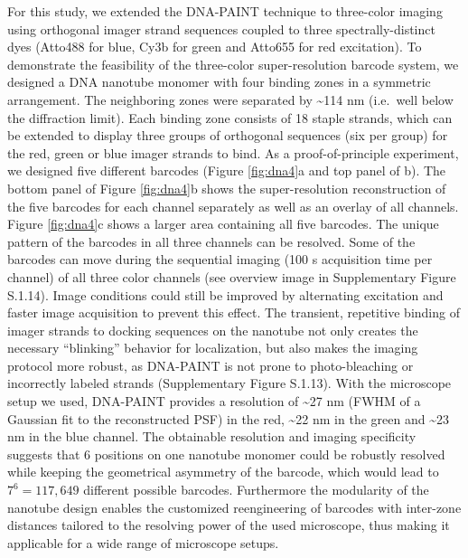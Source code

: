 For this study, we extended the DNA-PAINT technique to three-color imaging 
using orthogonal imager strand sequences coupled to three spectrally-distinct dyes 
(Atto488 for blue, Cy3b for green and Atto655 for red excitation). To demonstrate the 
feasibility of the three-color super-resolution barcode system, we designed a DNA 
nanotube monomer with four binding zones in a symmetric arrangement. The neighboring 
zones were separated by \textasciitilde114 nm (i.e.~well below the diffraction limit). Each binding 
zone consists of 18 staple strands, which can be extended to display three groups of 
orthogonal sequences (six per group) for the red, green or blue imager strands to bind. As 
a proof-of-principle experiment, we designed five different barcodes (Figure \ref{fig:dna4}a and top 
panel of b). The bottom panel of Figure \ref{fig:dna4}b shows the super-resolution reconstruction of 
the five barcodes for each channel separately as well as an overlay of all channels. Figure 
 \ref{fig:dna4}c shows a larger area containing all five barcodes. The unique pattern of the barcodes in 
all three channels can be resolved. Some of the barcodes can move during the sequential 
imaging (100 s acquisition time per channel) of all three color channels (see overview 
image in  Supplementary Figure 
S.1.14). Image conditions could still be improved by alternating excitation 
and faster image acquisition to prevent this effect. The transient, repetitive binding of 
imager strands to docking sequences on the nanotube not only creates the necessary 
``blinking'' behavior for localization, but also makes the imaging protocol more robust, as 
DNA-PAINT is not prone to photo-bleaching or incorrectly labeled strands (Supplementary Figure 
S.1.13). 
With the microscope setup we used, DNA-PAINT provides a resolution of \textasciitilde27 nm 
(FWHM of a Gaussian fit to the reconstructed PSF) in the red, \textasciitilde22 nm in the green and 
\textasciitilde23 nm in the blue channel. The obtainable resolution and imaging specificity suggests 
that 6 positions on one nanotube monomer could be robustly resolved while keeping the 
geometrical asymmetry of the barcode, which would lead to $7^6=117,649$ different 
possible barcodes. Furthermore the modularity of the nanotube design enables the 
customized reengineering of barcodes with inter-zone distances tailored to the resolving 
power of the used microscope, thus making it applicable for a wide range of microscope 
setups.

